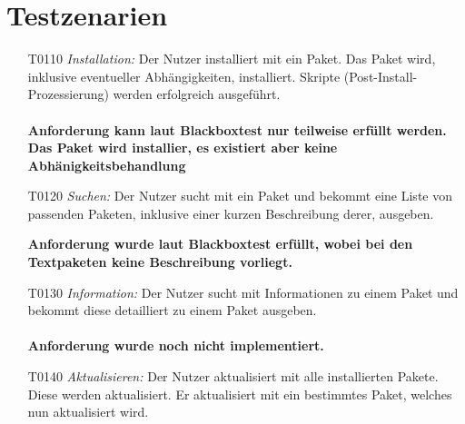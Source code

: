 \chapter{Testzenarien}
\begin{itemize}
	\item[T0110] \textit{Installation:}	Der Nutzer installiert mit  ein Paket. Das Paket wird, inklusive eventueller Abhängigkeiten, installiert. Skripte (Post-Install-Prozessierung) werden erfolgreich ausgeführt.\\\\
	\textbf{Anforderung kann laut Blackboxtest nur teilweise erfüllt werden. Das Paket wird installier, es existiert aber keine Abhänigkeitsbehandlung}
	\item[T0120] \textit{Suchen:} Der Nutzer sucht mit  ein Paket und bekommt eine Liste von passenden Paketen, inklusive einer kurzen Beschreibung derer, ausgeben.
    
    \textbf{Anforderung wurde laut Blackboxtest erfüllt, wobei bei den Textpaketen keine Beschreibung vorliegt.}
    
	\item[T0130] \textit{Information:} Der Nutzer sucht mit  Informationen zu einem Paket und bekommt diese detailliert zu einem Paket ausgeben.\\\\
	\textbf{Anforderung wurde noch nicht implementiert.}
	
	\item[T0140] \textit{Aktualisieren:} Der Nutzer aktualisiert mit  alle installierten Pakete. Diese werden aktualisiert. Er aktualisiert mit  ein bestimmtes Paket, welches nun aktualisiert wird.\\\\


\end{itemize}
